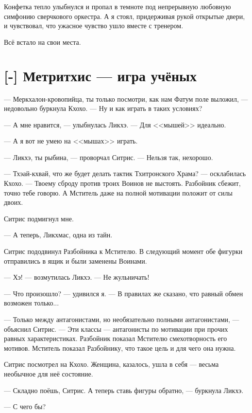 Конфетка тепло улыбнулся и пропал в темноте под непрерывную любовную симфонию сверчкового оркестра.
А я стоял, придерживая рукой открытые двери, и чувствовал, что ужасное чувство ушло вместе с тренером.

Всё встало на свои места.

\section{[-] Метритхис --- игра учёных}


--- Меркхалон-кровопийца, ты только посмотри, как нам Фатум поле выложил, --- недовольно буркнула Кхохо.
--- Ну и как играть в таких условиях?

--- А мне нравится, --- улыбнулась Ликхэ.
--- Для <<мышей>> идеально.

--- А я вот не умею на <<мышах>> играть.

\textspace

--- Ликхэ, ты рыбина, --- проворчал Ситрис.
--- Нельзя так, нехорошо.

--- Тхэай-кхвай, что же будет делать тактик Тхитронского Храма? --- осклабилась Кхохо.
--- Твоему сброду против троих Воинов не выстоять.
Разбойник сбежит, точно тебе говорю.
А Мститель даже на полной мотивации положит от силы двоих.

Ситрис подмигнул мне.

--- А теперь, Ликхмас, одна из тайн.

Ситрис пододвинул Разбойника к Мстителю.
В следующий момент обе фигурки отправились в ящик и были заменены Воинами.

--- Хэ! --- возмутилась Ликхэ.
--- Не жульничать!

--- Что произошло? --- удивился я.
--- В правилах же сказано, что равный обмен возможен только...

--- Только между антагонистами, но необязательно полными антагонистами, --- объяснил Ситрис.
--- Эти классы --- антагонисты по мотивации при прочих равных характеристиках.
Разбойник показал Мстителю смехотворность его мотивов.
Мститель показал Разбойнику, что такое цель и для чего она нужна.

Ситрис посмотрел на Кхохо.
Женщина, казалось, ушла в себя --- весьма необычное для неё состояние.

--- Складно поёшь, Ситрис.
А теперь ставь фигуры обратно, --- буркнула Ликхэ.

--- С чего бы?

